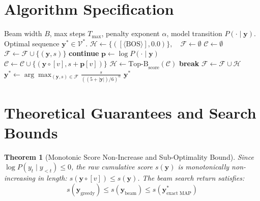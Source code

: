 \documentclass[11pt,a4paper]{article}
\newtheorem{theorem}{Theorem}
\theoremstyle{definition}
\begin{document}
\section{Algorithm Specification}

\begin{algorithm}[H]
\caption{Beam Search with GNMT Length Normalization}
\label{alg:beam_search}
\begin{algorithmic}[1]
\Require Beam width $B$, max steps $T_{\max}$, penalty exponent $\alpha$, model transition $P(\cdot \mid \mathbf{y})$.
\Ensure Optimal sequence $\mathbf{y}^* \in \mathcal{V}^*$.
\State $\mathcal{H} \gets \{([\langle \text{BOS} \rangle], 0.0)\}, \quad \mathcal{F} \gets \emptyset$
    \State $\mathcal{C} \gets \emptyset$
            \State $\mathcal{F} \gets \mathcal{F} \cup \{(\mathbf{y}, s)\}$
            \State \textbf{continue}
        \EndIf
        \State $\mathbf{p} \gets \log P(\cdot \mid \mathbf{y})$
            \State $\mathcal{C} \gets \mathcal{C} \cup \{(\mathbf{y} \circ [v], s + \mathbf{p}[v])\}$
        \EndFor
    \EndFor
    \State $\mathcal{H} \gets \text{Top-B}_{\text{score}}(\mathcal{C})$
     \textbf{break} \EndIf
\EndFor
\State $\mathcal{F} \gets \mathcal{F} \cup \mathcal{H}$
\State $\mathbf{y}^* \gets \arg\max_{(\mathbf{y}, s) \in \mathcal{F}} \frac{s}{((5 + |\mathbf{y}|)/6)^\alpha}$
\State \Return $\mathbf{y}^*$
\end{algorithmic}
\end{algorithm}

\section{Theoretical Guarantees and Search Bounds}

\begin{theorem}[Monotonic Score Non-Increase and Sub-Optimality Bound]
\label{thm:beam_search_bound}
Since $\log P(y_t \mid y_{<t}) \le 0$, the raw cumulative score $s(\mathbf{y})$ is monotonically non-increasing in length: $s(\mathbf{y} \circ [v]) \le s(\mathbf{y})$. The beam search return satisfies:
\begin{equation}
s(\mathbf{y}_{\text{greedy}}) \le s(\mathbf{y}_{\text{beam}}) \le s(\mathbf{y}_{\text{exact MAP}}^*)
\end{equation}
\end{theorem}
\end{document}
